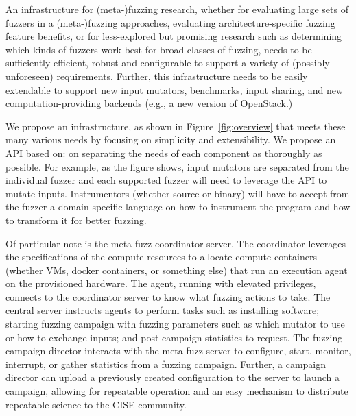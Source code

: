 


An infrastructure for (meta-)fuzzing research, 
whether for evaluating large sets of fuzzers in a (meta-)fuzzing approaches, 
evaluating architecture-specific fuzzing feature benefits, 
or for less-explored but promising research such as determining which kinds of 
fuzzers work best for broad classes of fuzzing, needs to be sufficiently 
efficient, robust and configurable to support a variety of (possibly 
unforeseen) requirements.  
Further, this infrastructure needs to be easily extendable to support new input 
mutators, benchmarks, input sharing, and new computation-providing backends 
(e.g., a new version of OpenStack.)

We propose an infrastructure, as shown in Figure~\ref{fig:overview} 
that meets these many various needs by focusing on 
simplicity and extensibility.  We propose an API based on:
on separating the needs of each component as thoroughly as possible.
For example, as the figure shows, input mutators are separated from the
individual fuzzer and each supported fuzzer will need to leverage the API to
mutate inputs.  Instrumentors (whether source or binary) will have to accept 
from the fuzzer a domain-specific language on how to instrument the program
and how to transform it for better fuzzing.  

Of particular note is the meta-fuzz coordinator server.
The coordinator leverages the specifications
of the compute resources to allocate compute containers (whether VMs, 
docker containers, or something else) that run an execution agent 
on the provisioned hardware.   The agent, running with elevated privileges, 
connects to the coordinator server to know what fuzzing actions to take.
The central server instructs agents to perform tasks such as 
installing software; starting fuzzing campaign with fuzzing parameters such as 
which mutator to use or how to exchange inputs; and post-campaign statistics to request.
The fuzzing-campaign director interacts with the meta-fuzz server to configure, start, 
monitor, interrupt, or gather statistics from a fuzzing campaign.  Further, a 
campaign director can upload a previously created configuration to the server 
to launch a campaign, allowing for repeatable operation and an easy mechanism to distribute
repeatable science to the CISE community.  

